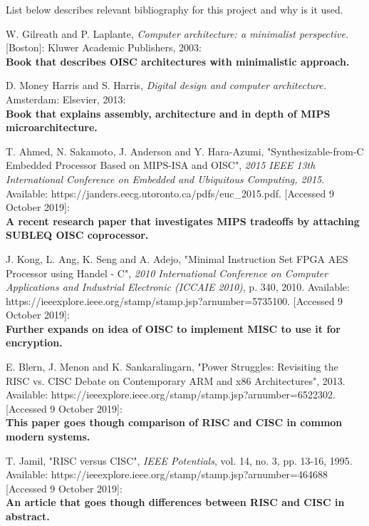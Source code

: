 \documentclass[a4paper,11pt]{article}
\begin{document}
List below describes relevant bibliography for this project and why is it used.
\renewcommand{\refname}{}
\begin{thebibliography}{9}
	
 W. Gilreath and P. Laplante, \textit{Computer architecture: a minimalist perspective.} [Boston]: Kluwer Academic Publishers, 2003: \\
\textbf{Book that describes OISC architectures with minimalistic approach.}

 D. Money Harris and S. Harris, \textit{Digital design and computer architecture.} Amsterdam: Elsevier, 2013: \\
\textbf{Book that explains assembly, architecture and in depth of MIPS microarchitecture.}

 T. Ahmed, N. Sakamoto, J. Anderson and Y. Hara-Azumi, "Synthesizable-from-C Embedded Processor Based on MIPS-ISA and OISC", \textit{2015 IEEE 13th International Conference on Embedded and Ubiquitous Computing, 2015}. Available: https://janders.eecg.utoronto.ca/pdfs/euc\_2015.pdf. [Accessed 9 October 2019]: \\
\textbf{A recent research paper that investigates MIPS tradeoffs by attaching SUBLEQ OISC coprocessor.}

 J. Kong, L. Ang, K. Seng and A. Adejo, "Minimal Instruction Set FPGA AES Processor using Handel - C", \textit{2010 International Conference on Computer Applications and Industrial Electronic (ICCAIE 2010)}, p. 340, 2010. Available: https://ieeexplore.ieee.org/stamp/stamp.jsp?arnumber=5735100. [Accessed 9 October 2019]: \\
\textbf{Further expands on idea of OISC to implement MISC to use it for encryption.}

 E. Blern, J. Menon and K. Sankaralingarn, "Power Struggles: Revisiting the RISC vs. CISC Debate on Contemporary ARM and x86 Architectures", 2013. Available: https://ieeexplore.ieee.org/stamp/stamp.jsp?arnumber=6522302. [Accessed 9 October 2019]: \\
\textbf{This paper goes though comparison of RISC and CISC in common modern systems.}
	
 T. Jamil, "RISC versus CISC", \textit{IEEE Potentials}, vol. 14, no. 3, pp. 13-16, 1995. Available: https://ieeexplore.ieee.org/stamp/stamp.jsp?arnumber=464688 [Accessed 9 October 2019]: \\
\textbf{An article that goes though differences between RISC and CISC in abstract.}

\end{thebibliography}
\end{document}
